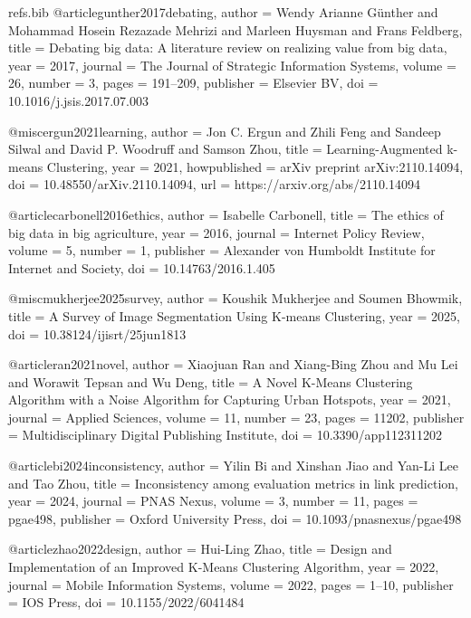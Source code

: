 \begin{filecontents*}[overwrite]{refs.bib}
@article{gunther2017debating,
  author = {Wendy Arianne G{\"u}nther and Mohammad Hosein Rezazade Mehrizi and Marleen Huysman and Frans Feldberg},
  title = {{Debating big data: A literature review on realizing value from big data}},
  year = {2017},
  journal = {The Journal of Strategic Information Systems},
  volume = {26},
  number = {3},
  pages = {191--209},
  publisher = {Elsevier BV},
  doi = {10.1016/j.jsis.2017.07.003}
}

@misc{ergun2021learning,
  author = {Jon C. Ergun and Zhili Feng and Sandeep Silwal and David P. Woodruff and Samson Zhou},
  title = {{Learning-Augmented k-means Clustering}},
  year = {2021},
  howpublished = {arXiv preprint arXiv:2110.14094},
  doi = {10.48550/arXiv.2110.14094},
  url = {https://arxiv.org/abs/2110.14094}
}

@article{carbonell2016ethics,
  author = {Isabelle Carbonell},
  title = {{The ethics of big data in big agriculture}},
  year = {2016},
  journal = {Internet Policy Review},
  volume = {5},
  number = {1},
  publisher = {Alexander von Humboldt Institute for Internet and Society},
  doi = {10.14763/2016.1.405}
}

@misc{mukherjee2025survey,
  author = {Koushik Mukherjee and Soumen Bhowmik},
  title = {{A Survey of Image Segmentation Using K-means Clustering}},
  year = {2025},
  doi = {10.38124/ijisrt/25jun1813}
}

@article{ran2021novel,
  author = {Xiaojuan Ran and Xiang-Bing Zhou and Mu Lei and Worawit Tepsan and Wu Deng},
  title = {{A Novel K-Means Clustering Algorithm with a Noise Algorithm for Capturing Urban Hotspots}},
  year = {2021},
  journal = {Applied Sciences},
  volume = {11},
  number = {23},
  pages = {11202},
  publisher = {Multidisciplinary Digital Publishing Institute},
  doi = {10.3390/app112311202}
}

@article{bi2024inconsistency,
  author = {Yilin Bi and Xinshan Jiao and Yan-Li Lee and Tao Zhou},
  title = {{Inconsistency among evaluation metrics in link prediction}},
  year = {2024},
  journal = {PNAS Nexus},
  volume = {3},
  number = {11},
  pages = {pgae498},
  publisher = {Oxford University Press},
  doi = {10.1093/pnasnexus/pgae498}
}

@article{zhao2022design,
  author = {Hui-Ling Zhao},
  title = {{Design and Implementation of an Improved K-Means Clustering Algorithm}},
  year = {2022},
  journal = {Mobile Information Systems},
  volume = {2022},
  pages = {1--10},
  publisher = {IOS Press},
  doi = {10.1155/2022/6041484}
}


\end{filecontents*}
